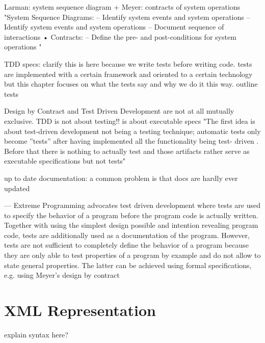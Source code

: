 Larman: system sequence diagram + Meyer: contracts of system operations
"System Sequence Diagrams:
–
Identify system events and system operations
–
Identify system events and system operations
– Document sequence of interactions
• Contracts:
– Define the pre- and post-conditions for system
operations "


TDD specs:
clarify this is here because we write tests before writing code. tests are implemented with a certain framework and oriented to a certain technology but this chapter focuses on what the tests say and why we do it this way.
outline tests


Design by Contract and Test Driven Development are not at all mutually exclusive.
TDD is not about testing!! is about executable specs
"The first idea is about test-driven development not being a testing technique;
automatic tests only become ”tests” after having implemented all the functionality
being test-
driven
. Before that there is nothing to actually
test
and those artifacts
rather serve as executable
specifications
but not tests"

up to date documentation: a common problem is that docs are hardly ever updated


---
Extreme Programming advocates test driven development where tests are used
to specify the behavior of a program before the program code is actually written.
Together with using the simplest design possible and intention revealing program
code, tests are additionally used as a documentation of the program. However,
tests are not sufficient to completely define the behavior of a program because
they are only able to test properties of a program by example and do not allow to
state general properties. The latter can be achieved using formal specifications,
e.g. using Meyer’s design by contract %

\section{XML Representation}
explain syntax here?